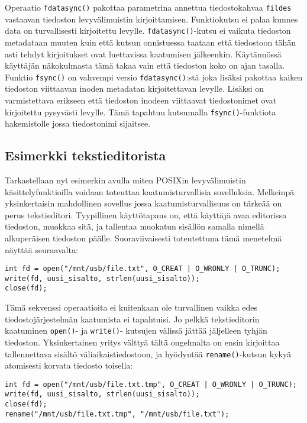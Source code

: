 Operaatio \texttt{fdatasync()} pakottaa parametrina annettua tiedostokahvaa \texttt{fildes} vastaavan tiedoston levyvälimuistin kirjoittamisen.
Funktiokutsu ei palaa kunnes data on turvallisesti kirjoitettu levylle.
\texttt{fdatasync()}-kutsu ei vaikuta tiedoston metadataan muuten kuin että kutsun onnistuessa taataan että tiedostoon tähän asti tehdyt kirjoitukset ovat luettavissa kaatumisen jälkeenkin.
Käytännössä käyttäjän näkokulmasta tämä takaa vain että tiedoston koko on ajan tasalla.
Funktio \texttt{fsync()} on vahvempi versio \texttt{fdatasync()}:stä joka lisäksi pakottaa kaiken tiedoston viittaavan inoden metadatan kirjoitettavan levylle.
Lisäksi on varmistettava erikseen että tiedoston inodeen viittaavat tiedostonimet ovat kirjoitettu pysyvästi levylle.
Tämä tapahtuu kutsumalla \texttt{fsync()}-funktiota hakemistolle jossa tiedostonimi sijaitsee.

\subsection{Esimerkki tekstieditorista}
Tarkastellaan nyt esimerkin avulla miten POSIXin levyvälimuistin käsittelyfunktioilla voidaan toteuttaa kaatumisturvallisia sovelluksia.
Melkeinpä yksinkertaisin mahdollinen sovellus jossa kaatumisturvallisuus on tärkeää on perus tekstieditori.
Tyypillinen käyttötapaus on, että käyttäjä avaa editorissa tiedoston, muokkaa sitä, ja tallentaa muokatun sisällön samalla nimellä alkuperäisen tiedoston päälle.
Suoraviivaisesti toteutettuna tämä menetelmä näyttää seuraavalta:

\begin{verbatim}
int fd = open("/mnt/usb/file.txt", O_CREAT | O_WRONLY | O_TRUNC);
write(fd, uusi_sisalto, strlen(uusi_sisalto));
close(fd);
\end{verbatim}

Tämä sekvenssi operaatioita ei kuitenkaan ole turvallinen vaikka edes tiedostojärjestelmän kaatumista ei tapahtuisi.
Jo pelkkä tekstieditorin kaatuminen \texttt{open()}- ja \texttt{write()}- kutsujen välissä jättää jäljelleen tyhjän tiedoston.
Yksinkertainen yritys välttyä tältä ongelmalta on ensin kirjoittaa tallennettava sisältö väliaikaistiedostoon,
ja hyödyntää \texttt{rename()}-kutsun kykyä atomisesti korvata tiedosto toisella:

\begin{verbatim}
int fd = open("/mnt/usb/file.txt.tmp", O_CREAT | O_WRONLY | O_TRUNC);
write(fd, uusi_sisalto, strlen(uusi_sisalto));
close(fd);
rename("/mnt/usb/file.txt.tmp", "/mnt/usb/file.txt");
\end{verbatim}


